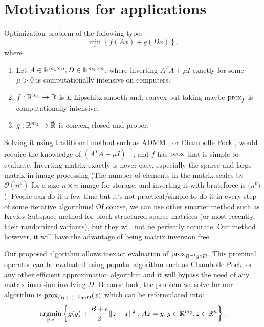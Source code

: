 \documentclass[12pt]{article}
\begin{document}
\section{Motivations for applications}
    Optimization problem of the following type: 
    $$
        \min_{x} \left\lbrace
            f(Ax) + g(Dx)
        \right\rbrace, 
    $$
    where
    \begin{enumerate}[nosep]
        \item Let $A \in \mathbb R^{m_1 \times n}, D \in \mathbb R^{m_2 \times n}$,  where inverting $A^TA + \mu I$ exactly for some $\mu > 0$ is computationally intensive on computers. 
        \item $f: \mathbb R^{m_1} \rightarrow \mathbb R$ is $L$ Lipschitz smooth and, convex but taking maybe $\operatorname{prox}_f$ is computationally intensive. 
        \item $g: \mathbb R^{m_2} \rightarrow \overline {\mathbb R}$ is convex, closed and proper. 
    \end{enumerate}
    Solving it using traditional method such as ADMM \cite[chapter 6]{boyd_distributed_2011}, or Chambolle Pock \cite{chambolle_first-order_2010}, would require the knowledge of $(A^TA + \mu I)^{-1}$, and $f$ has $\operatorname{prox}$ that is simple to evaluate. 
    Inverting matrix exactly is never easy, especially the sparse and large matrix in image processing (The number of elements in the matrix scales by $\mathcal O(n^4)$ for a size $n \times n$ image for storage, and inverting it with bruteforce is $\mathcal (n^{6})$). 
    People can do it a few time but it's not practical/simple to do it in every step of some iterative algorithms! 
    Of course, we can use other smarter method such as Krylov Subspace method for block structured sparse matrices (or most recently, their randomized variants), but they will not be perfectly accurate.
    Our method however, it will have the advantage of being matrix inversion free. 
    \par
    Our proposed algorithm allows inexact evaluation of $\operatorname{prox}_{B^{-1}g\circ D}$. 
    This proximal operator can be evaluated using popular algorithm such as Chambolle Pock, or any other efficient approximation algorithm and it will bypass the need of any matrix inversion involving $D$. 
    Because look, the problem we solve for our algorithm is $\operatorname{prox}_{(B + \epsilon)^{-1}g\circ D}(x)$ which can be reformulated into: 
    \begin{align*}
        \mathop{\rm argmin}\limits_{y, z} \left\lbrace
            g(y) + \frac{B + \epsilon}{2}\Vert z - x\Vert^2 : Az = y, y\in \mathbb R^{m_2}, z\in \mathbb R^{n}
        \right\rbrace. 
    \end{align*}
\end{document}
